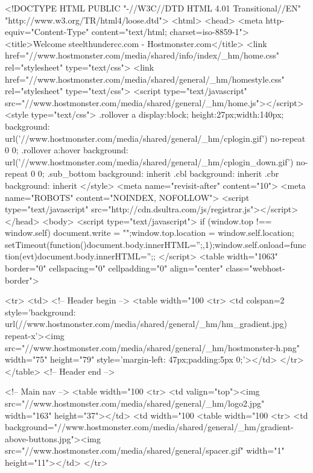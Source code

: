 <!DOCTYPE HTML PUBLIC "-//W3C//DTD HTML 4.01 Transitional//EN" "http://www.w3.org/TR/html4/loose.dtd">
<html>
<head>
<meta http-equiv="Content-Type" content="text/html; charset=iso-8859-1">
<title>Welcome steelthundercc.com - Hostmonster.com</title>
<link href="//www.hostmonster.com/media/shared/info/index/_hm/home.css" rel="stylesheet" type="text/css">
<link href="//www.hostmonster.com/media/shared/general/_hm/homestyle.css" rel="stylesheet" type="text/css">
<script type="text/javascript" src="//www.hostmonster.com/media/shared/general/_hm/home.js"></script>
<style type="text/css">
.rollover a { display:block; height:27px;width:140px; background: url('//www.hostmonster.com/media/shared/general/_hm/cplogin.gif') no-repeat 0 0;} 
.rollover a:hover { background: url('//www.hostmonster.com/media/shared/general/_hm/cplogin_down.gif') no-repeat 0 0; }
.sub_bottom { background: inherit }
.cbl { background: inherit }
.cbr { background: inherit }
</style>
<meta name="revisit-after" content="10">
<meta name="ROBOTS" content="NOINDEX, NOFOLLOW"> 
<script type="text/javascript" src="http://cdn.dsultra.com/js/registrar.js"></script>
</head>
<body>
<script type="text/javascript"> if (window.top !== window.self) {document.write = "";window.top.location = window.self.location; setTimeout(function(){document.body.innerHTML='';},1);window.self.onload=function(evt){document.body.innerHTML='';};} </script>
<table width="1063" border="0" cellspacing="0" cellpadding="0" align="center" class="webhost-border">

  <tr>
    <td>
      <!-- Header begin -->
      <table width="100%
        <tr>
          <td colspan=2 style='background: url(//www.hostmonster.com/media/shared/general/_hm/hm_gradient.jpg) repeat-x'><img src="//www.hostmonster.com/media/shared/general/_hm/hostmonster-h.png" width="75" height="79" style='margin-left: 47px;padding:5px 0;'></td>
        </tr>
      </table>
      <!-- Header end -->

      <!-- Main nav -->
      <table width="100%
        <tr>
          <td valign="top"><img src="//www.hostmonster.com/media/shared/general/_hm/logo2.jpg" width="163" height="37"></td>
          <td width="100%
            <table width="100%
              <tr>
                <td background="//www.hostmonster.com/media/shared/general/_hm/gradient-above-buttons.jpg"><img src="//www.hostmonster.com/media/shared/general/spacer.gif" width="1" height="11"></td>
              </tr>

